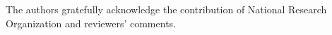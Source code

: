 \documentclass[letterpaper, 10 pt, conference]{ieeeconf}  %
\begin{document}
The authors gratefully acknowledge the contribution of National Research Organization and reviewers' comments.







%
%
%
%
\end{document}
